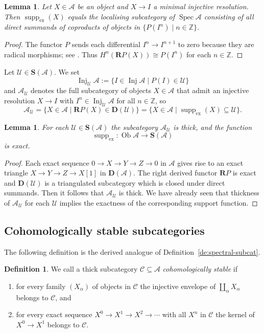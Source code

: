 \documentclass[a4paper]{amsart}
\theoremstyle{plain}
\newtheorem{lem}[thm]{Lemma}
\theoremstyle{definition}
\newtheorem{defn}[thm]{Definition}
\theoremstyle{remark}
\numberwithin{equation}{section}
\newcommand{\Inj}{\operatorname{Inj}}
\newcommand{\Ob}{\operatorname{Ob}}
\newcommand{\Spec}{\operatorname{Spec}}
\newcommand{\suppex}{\operatorname{supp}_{\mathrm{ex}}}
\newcommand{\lto}{\longrightarrow}
\def\A{\mathcal A}
\def\C{\mathcal C}
\def\U{\mathcal U}
\def\bfD{\mathbf D}
\def\bfR{\mathbf R}
\def\bfS{\mathbf S}
\def\bbZ{\mathbb Z}
\def\a{\alpha}
\begin{document}
\begin{lem}\label{le:res}
Let $X\in\A$ be an object and $X\to I$ a minimal injective resolution. Then
$\suppex(X)$ equals the localising subcategory of $\Spec\A$ consisting of all direct
summands of coproducts of objects in $\{P(I^n)\mid n\in\bbZ\}$.
\end{lem}
\begin{proof}
  The functor $P$ sends each differential $I^n\to I^{n+1}$ to zero
  because they are radical morphisms; see
  \cite[Proposition~4.3.18]{Kr2022}. Thus $H^n(\bfR P(X))\cong P(I^n)$
  for each $n\in\bbZ$.
\end{proof}


Let $\U\in\bfS(\A)$.  We set
\[\Inj_\U\A:=\{I\in\Inj\A\mid P(I)\in\U\}\]
and $\A_\U$ denotes the full subcategory of objects $X\in\A$ that
admit an injective resolution $X\to I$ with $I^n\in\Inj_\U\A$ for all
$n\in\bbZ$, so
\[\A_\U=\{X\in\A\mid \bfR
  P(X)\in\bfD(\U)\}=\{X\in\A\mid\suppex(X)\subseteq\U\}.\]

\begin{lem}\label{le:thick}
  For each $\U\in\bfS(\A)$ the subcategory $\A_\U$ is thick, and the
  function \[\suppex\colon\Ob\A\lto\bfS(\A)\] is exact.
\end{lem}

\begin{proof}
  Each exact sequence $0\to X\to Y\to Z\to 0$ in $\A$ gives rise to an
  exact triangle $X\to Y\to Z\to X[1]$ in $\bfD(\A)$. The right
  derived functor $\bfR P$ is exact and $\bfD(\U)$ is a triangulated
  subcategory which is closed under direct summands. Then it follows
  that $\A_\U$ is thick. We have already seen that thickness of
  $\A_\U$ for each $\U$ implies the exactness of the corresponding
  support function.
\end{proof}

\subsection*{Cohomologically stable subcategories}

The following definition is the derived analogue of Definition~\ref{de:spectral-subcat}.

\begin{defn}\label{de:stable-subcat}
  We call a thick subcategory $\C\subseteq\A$ 
  \emph{cohomologically stable} if
  \begin{enumerate}
\item for every family $(X_\a)$ of objects in $\C$ the injective
  envelope of  $\coprod_\a X_\a$ belongs to $\C$, and
\item for every exact sequence $X^0\to X^1\to X^2\to\cdots$ with all
  $X^n$ in $\C$ the kernel of $X^0\to X^1$ belongs to $\C$.
\end{enumerate}
\end{defn}
\end{document}
